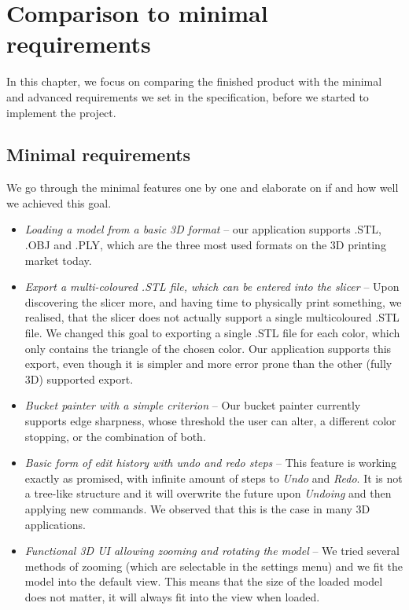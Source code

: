 \chapter{Comparison to minimal requirements}

In this chapter, we focus on comparing the finished product with the minimal and advanced requirements we set in the specification, before we started to implement the project.

\section{Minimal requirements}

We go through the minimal features one by one and elaborate on if and how well we achieved this goal.

\begin{itemize}
\item \textit{Loading a model from a basic 3D format} -- our application supports .STL, .OBJ and .PLY, which are the three most used formats on the 3D printing market today.

\item \textit{Export a multi-coloured .STL file, which can be entered into the slicer} -- Upon discovering the slicer more, and having time to physically print something, we realised, that the slicer does not actually support a single multicoloured .STL file. We changed this goal to exporting a single .STL file for each color, which only contains the triangle of the chosen color. Our application supports this export, even though it is simpler and more error prone than the other (fully 3D) supported export.

\item \textit{Bucket painter with a simple criterion} -- Our bucket painter currently supports edge sharpness, whose threshold the user can alter, a different color stopping, or the combination of both.

\item \textit{Basic form of edit history with undo and redo steps} -- This feature is working exactly as promised, with infinite amount of steps to \textit{Undo} and \textit{Redo}. It is not a tree-like structure and it will overwrite the future upon \textit{Undoing} and then applying new commands. We observed that this is the case in many 3D applications.

\item \textit{Functional 3D UI allowing zooming and rotating the model} -- We tried several methods of zooming (which are selectable in the settings menu) and we fit the model into the default view. This means that the size of the loaded model does not matter, it will always fit into the view when loaded.
\end{itemize}

